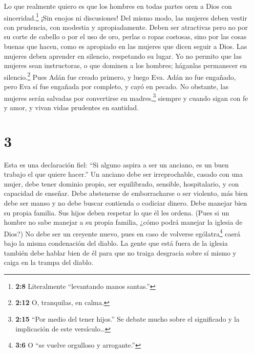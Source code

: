  Lo que realmente quiero es que los hombres en todas partes
oren a Dios con sinceridad.\footnote{\textbf{2:8} Literalmente
  ``levantando manos santas.''} ¡Sin enojos ni discusiones! 
Del mismo modo, las mujeres deben vestir con prudencia, con modestia y
apropiadamente. Deben ser atractivas pero no por su corte de cabello o
por el uso de oro, perlas o ropas costosas,  sino por las
cosas buenas que hacen, como es apropiado en las mujeres que dicen
seguir a Dios.  Las mujeres deben aprender en silencio,
respetando su lugar.  Yo no permito que las mujeres sean
instructoras, o que dominen a los hombres; háganlas permanecer en
silencio.\footnote{\textbf{2:12} O, tranquilas, en calma.} 
Pues Adán fue creado primero, y luego Eva.  Adán no fue
engañado, pero Eva sí fue engañada por completo, y cayó en pecado.
 No obstante, las mujeres serán salvadas por convertirse en
madres,\footnote{\textbf{2:15} ``Por medio del tener hijos.'' Se debate
  mucho sobre el significado y la implicación de este versículo\ldots{}}
siempre y cuando sigan con fe y amor, y vivan vidas prudentes en
santidad.

\hypertarget{section-2}{%
\section{3}\label{section-2}}

 Esta es una declaración fiel: ``Si alguno aspira a ser un
anciano, es un buen trabajo el que quiere hacer.''  Un
anciano debe ser irreprochable, casado con una mujer, debe tener dominio
propio, ser equilibrado, sensible, hospitalario, y con capacidad de
enseñar.  Debe abstenerse de emborracharse o ser violento,
más bien debe ser manso y no debe buscar contienda o codiciar dinero.
 Debe manejar bien su propia familia. Sus hijos deben
respetar lo que él les ordena.  (Pues si un hombre no sabe
manejar a su propia familia, ¿cómo podrá manejar la iglesia de Dios?)
 No debe ser un creyente nuevo, pues en caso de volverse
ególatra\footnote{\textbf{3:6} O ``se vuelve orgulloso y arrogante.''}
caerá bajo la misma condenación del diablo.  La gente que
está fuera de la iglesia también debe hablar bien de él para que no
traiga desgracia sobre sí mismo y caiga en la trampa del diablo.

